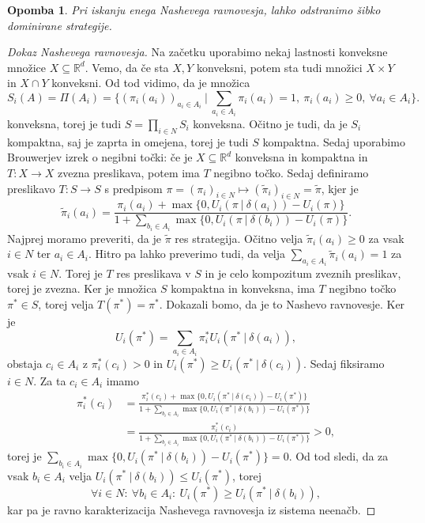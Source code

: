 \documentclass[10pt, a4paper]{article}
\newtheorem*{opomba}{Opomba}
\newenvironment{noticeC}{%
  \tcolorbox[%
  notitle,
  empty,
  enhanced,  %
  breakable,
  coltext=black, 
  fontupper=\rmfamily,
  noparskip,
  sharp corners,
  boxrule=-1pt,  %
  frame hidden,
  left=7pt,  %
  right=7pt,
  top=5pt,
  bottom=5pt,
  before skip=2.5ex plus 2pt,
  after skip=2.5ex plus 2pt,
  overlay unbroken and last={%
  },
  ]}
{\endtcolorbox}
\newenvironment{dokaz}%
  {\begin{noticeC}\begin{proof}}%
  {\end{proof}\end{noticeC}}
\newcommand{\R}{\mathbb {R}}
\begin{document}
\begin{opomba}
  Pri iskanju enega Nashevega ravnovesja, lahko odstranimo šibko dominirane strategije.
\end{opomba}

\begin{dokaz}[Dokaz Nashevega ravnovesja]
  Na začetku uporabimo nekaj lastnosti konveksne množice $X \subseteq \R^d$.
  Vemo, da če sta $X, Y$ konveksni, potem sta tudi množici $X \times Y$ in $X \cap Y$ konveksni.
  Od tod vidimo, da je množica 
  $$S_i (A) = \Pi(A_i) = \{(\pi_i(a_i))_{a_i \in A_i}\ |\ \sum_{a_i \in A_i} \pi_i (a_i) = 1,\ \pi_i (a_i) \geq 0,\ \forall a_i \in A_i\}.$$
  konveksna, torej je tudi $S = \prod_{i \in N} S_i$ konveksna. 
  Očitno je tudi, da je $S_i$ kompaktna, saj je zaprta in omejena, torej je tudi $S$ kompaktna.
  Sedaj uporabimo Brouwerjev izrek o negibni točki: če je $X \subseteq \R^d$
  konveksna in kompaktna in $T: X \to X$ zvezna preslikava, 
  potem ima $T$ negibno točko.
  Sedaj definiramo preslikavo 
  $T: S \to S$ s predpisom 
  $\pi = (\pi_i)_{i \in N} \mapsto (\widetilde{\pi}_i)_{i\in N} = \widetilde{\pi}$,
  kjer je 
  $$\widetilde{\pi}_i (a_i) = \frac{\pi_i (a_i) + \max \{0, U_i (\pi\ |\ \delta(a_i)) - U_i (\pi)\}}{1 + \sum_{b_i \in A_i} \max \{0, U_i (\pi\ |\ \delta(b_i)) - U_i (\pi)\}}.$$
  Najprej moramo preveriti, da je $\widetilde{\pi}$ res strategija.
  Očitno velja $\widetilde{\pi}_i (a_i) \geq 0$ za vsak $i \in N$ ter $a_i \in A_i$.
  Hitro pa lahko preverimo tudi, da velja $\sum_{a_i \in A_i} \widetilde{\pi}_i (a_i) = 1$ za vsak $i \in N$.
  Torej je $T$ res preslikava v $S$ in je celo kompozitum zveznih preslikav, torej je zvezna.
  Ker je množica $S$ kompaktna in konveksna, ima $T$ negibno točko $\pi^* \in S$, torej velja 
  $T(\pi^*) = \pi^*$. Dokazali bomo, da je to Nashevo ravnovesje.
  Ker je 
  $$U_i (\pi^*) = \sum_{a_i \in A_i} \pi_i^* U_i (\pi^*\ |\ \delta(a_i)),$$
  obstaja $c_i \in A_i$ z $\pi_i^* (c_i) > 0$ in $U_i (\pi^*) \geq U_i (\pi^*\ |\ \delta(c_i))$.
  Sedaj fiksiramo $i \in N$. Za ta $c_i \in A_i$ imamo 
  \begin{align*}
    \pi_i ^* (c_i) &= \frac{\pi_i^* (c_i) + \max \{0, U_i (\pi^*\ |\ \delta(c_i)) - U_i (\pi^*)\}}{1 + \sum_{b_i \in A_i} \max \{0, U_i (\pi^*\ |\ \delta(b_i)) - U_i (\pi^*)\}}\\ 
    &= \frac{\pi_i^* (c_i)}{1 + \sum_{b_i \in A_i} \max \{0, U_i (\pi^*\ |\ \delta(b_i)) - U_i (\pi^*)\}} > 0,
  \end{align*}
  torej je $\sum_{b_i \in A_i} \max \{0, U_i (\pi^*\ |\ \delta(b_i)) - U_i (\pi^*)\} = 0.$
  Od tod sledi, da za vsak $b_i \in A_i$ velja $U_i (\pi^*\ |\ \delta(b_i)) \leq U_i (\pi^*)$, torej 
  $$\forall i \in N:\ \forall b_i \in A_i:\ U_i (\pi^*) \geq U_i(\pi^*\ |\ \delta(b_i)),$$
  kar pa je ravno karakterizacija Nashevega ravnovesja iz sistema neenačb.
\end{dokaz}
\end{document}
